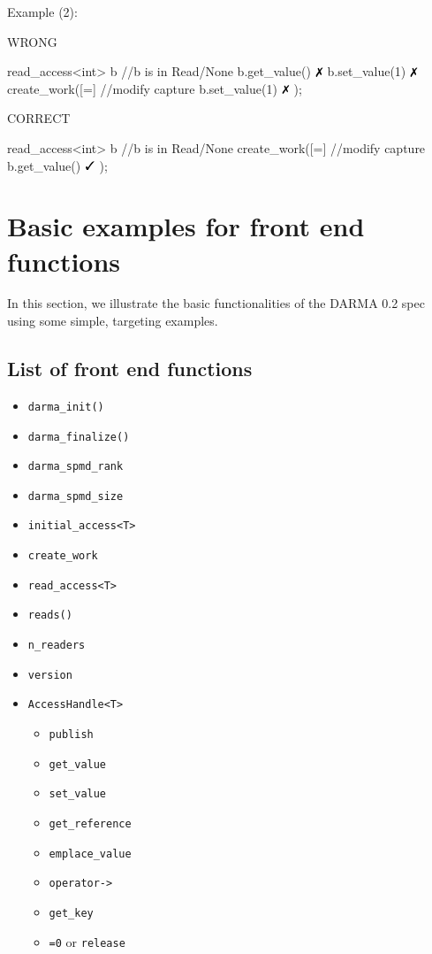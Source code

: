 Example (2): 
\hspace{-0.75cm}
\begin{minipage}[t]{0.45\linewidth}%
\centering
WRONG
\begin{vaspPseudo}
read_access<int> b
//b is in Read/None
b.get_value()   $\no$
b.set_value(1)  $\no$
create_work([=]{ //modify capture
  b.set_value(1) $\no$
});
\end{vaspPseudo}
\end{minipage}
\hspace{0.55cm}
\begin{minipage}[t]{0.45\linewidth}
\centering
CORRECT
\begin{vaspPseudo}
read_access<int> b
//b is in Read/None
create_work([=]{ //modify capture
  b.get_value()  $\yes$
});
\end{vaspPseudo}
\end{minipage}




\clearpage
\section{Basic examples for front end functions}

In this section, we illustrate the basic functionalities of 
the DARMA 0.2 spec using some simple, targeting examples.


\subsection{List of front end functions}

\begin{itemize}
\item \texttt{darma\_init()}
\item \texttt{darma\_finalize()}
\item \texttt{darma\_spmd\_rank}
\item \texttt{darma\_spmd\_size}

\item \texttt{initial\_access<T>}
\item \texttt{create\_work}
\item \texttt{read\_access<T>}

\item \texttt{reads()}
\item \texttt{n\_readers}
\item \texttt{version}

\item \texttt{AccessHandle<T>}
\begin{itemize}
  \item \texttt{publish}
  \item \texttt{get\_value}
  \item \texttt{set\_value}
  \item \texttt{get\_reference}
  \item \texttt{emplace\_value}
  \item \texttt{operator->}
  \item \texttt{get\_key}
  \item \texttt{=0} or \texttt{release}
\end{itemize}
\end{itemize}



